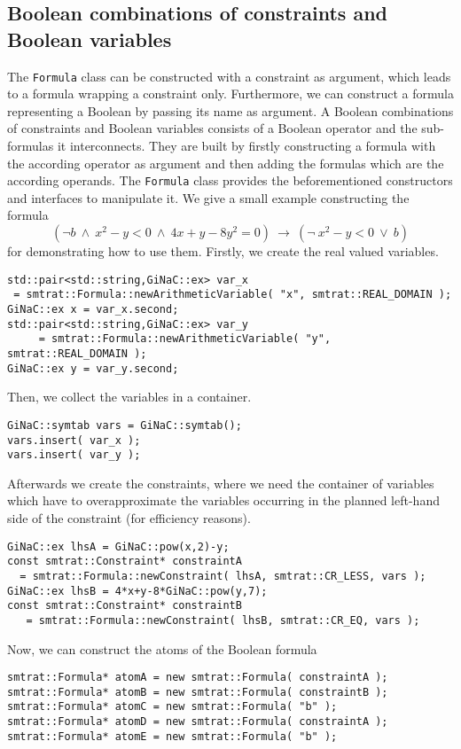 \subsection{Boolean combinations of constraints and Boolean variables}
The \texttt{Formula} class can be constructed with a constraint as argument, which leads to a formula wrapping a constraint only. Furthermore, we can construct a formula representing a Boolean by passing its name as argument. A Boolean combinations of constraints and Boolean variables consists of a Boolean operator and the sub-formulas it interconnects. They are built by firstly constructing a formula with the according operator as argument and then adding the formulas which are the according operands. The \texttt{Formula} class provides the beforementioned constructors and interfaces to manipulate it. We give a small example constructing the formula \[(\neg b\ \land\ x^2-y<0\ \land\ 4x+y-8y^2=0 )\ \rightarrow\ (\neg\ x^2-y<0\ \lor\ b )\]
for demonstrating how to use them. Firstly, we create the real valued variables.
\scriptsize
\begin{verbatim}
std::pair<std::string,GiNaC::ex> var_x 
 = smtrat::Formula::newArithmeticVariable( "x", smtrat::REAL_DOMAIN );
GiNaC::ex x = var_x.second;
std::pair<std::string,GiNaC::ex> var_y
     = smtrat::Formula::newArithmeticVariable( "y", smtrat::REAL_DOMAIN );
GiNaC::ex y = var_y.second;
\end{verbatim}
\normalsize
Then, we collect the variables in a container.
\scriptsize
\begin{verbatim}
GiNaC::symtab vars = GiNaC::symtab();
vars.insert( var_x );
vars.insert( var_y );
\end{verbatim}
\normalsize
Afterwards we create the constraints, where we need the container of variables which have to overapproximate the
variables occurring in the planned left-hand side of the constraint (for efficiency reasons).
\scriptsize
\begin{verbatim}
GiNaC::ex lhsA = GiNaC::pow(x,2)-y;
const smtrat::Constraint* constraintA 
  = smtrat::Formula::newConstraint( lhsA, smtrat::CR_LESS, vars );
GiNaC::ex lhsB = 4*x+y-8*GiNaC::pow(y,7);
const smtrat::Constraint* constraintB
   = smtrat::Formula::newConstraint( lhsB, smtrat::CR_EQ, vars );
\end{verbatim}
\normalsize
Now, we can construct the atoms of the Boolean formula
\scriptsize
\begin{verbatim}
smtrat::Formula* atomA = new smtrat::Formula( constraintA );
smtrat::Formula* atomB = new smtrat::Formula( constraintB );
smtrat::Formula* atomC = new smtrat::Formula( "b" );
smtrat::Formula* atomD = new smtrat::Formula( constraintA );
smtrat::Formula* atomE = new smtrat::Formula( "b" );
\end{verbatim}
